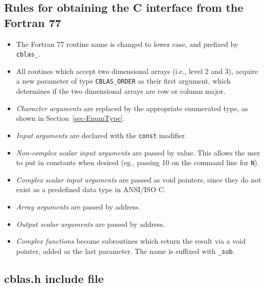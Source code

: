 \documentclass{article}
\begin{document}

\subsection{Rules for obtaining the C interface from the Fortran 77}
\label{legacy:c_rules}


\begin{itemize}
   \item The Fortran 77 routine name is changed to lower case, and prefixed by {\tt cblas\_}.
   \item All routines which accept two dimensional arrays (i.e., level 2 and 3),
         acquire a new parameter of type {\tt CBLAS\_ORDER} as their first
         argument, which determines if the two dimensional arrays are row or
         column major.
   \item {\em Character arguments} are replaced by the appropriate enumerated type,
         as shown in Section~\ref{sec-EnumType}.
   \item {\em Input arguments} are declared with the {\tt const} modifier.
   \item {\em Non-complex scalar input arguments} are passed by value.  This
         allows the user to put in constants when desired (eg., passing 10 on
         the command line for \verb+N+).
   \item {\em Complex scalar input arguments} are passed as void pointers,
         since they do not exist as a predefined data type in ANSI/ISO C.
   \item {\em Array arguments} are passed by address.
   \item {\em Output scalar arguments} are passed by address.
   \item {\em Complex functions} become subroutines which return the result via
         a void pointer, added as the last parameter.  The name is suffixed
         with {\tt \_sub}.
\end{itemize}

\subsection{cblas.h include file}
\label{sec-cblash}
\end{document}
